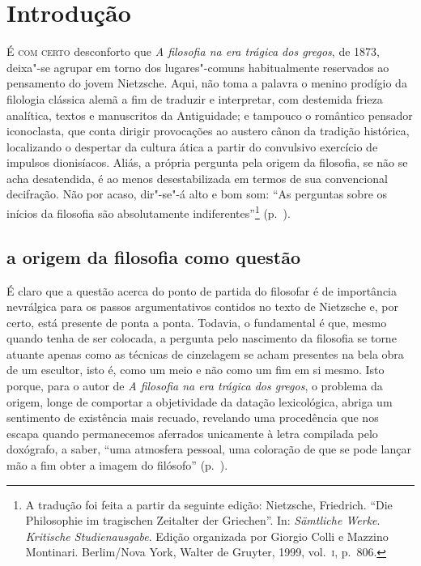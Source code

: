 
\chapter[Introdução, por Fernando R.~de Moraes Barros]{Introdução}

\textsc{É com certo} desconforto que \textit{A filosofia na era trágica dos
gregos}, de 1873, deixa"-se agrupar em torno dos lugares"-comuns
habitualmente reservados ao pensamento do jovem Nietzsche. Aqui, não
toma a palavra o menino prodígio da filologia clássica alemã a fim de
traduzir e interpretar, com destemida frieza analítica, textos e
manuscritos da Antiguidade; e tampouco o romântico pensador iconoclasta,
que conta dirigir provocações ao austero cânon da
tradição histórica, localizando o despertar da cultura ática a partir
do convulsivo exercício de impulsos dionisíacos. Aliás, a própria
pergunta pela origem da filosofia, se não se acha desatendida, é ao
menos desestabilizada em termos de sua convencional decifração. Não por
acaso, dir"-se"-á alto e bom som: ``As perguntas sobre os
inícios da filosofia são absolutamente
indiferentes''\footnote { A tradução foi feita a partir da seguinte edição: Nietzsche, Friedrich. ``Die
Philosophie im tragischen Zeitalter der Griechen''. In:
\textit{Sämtliche Werke}. \textit{Kritische Studienausgabe}. Edição
organizada por Giorgio Colli e Mazzino Montinari. Berlim/Nova York,
Walter de Gruyter, 1999, vol.~\textsc{i}, p.~806.} (p.~\pageref{perguntassobreosinicios}). 

\section{a origem da filosofia como questão}
É claro que a questão acerca do ponto de partida do filosofar é de
importância nevrálgica para os passos argumentativos contidos no texto
de Nietzsche e, por certo, está presente de ponta a ponta. Todavia, o
fundamental é que, mesmo quando tenha de ser colocada, a pergunta pelo
nascimento da filosofia se torne atuante apenas como as técnicas de
cinzelagem se acham presentes na bela obra de um escultor, isto é, como
um meio e não como um fim em si mesmo. Isto porque, para o autor de
\textit{A filosofia na era trágica dos gregos}, o problema da origem,
longe de comportar a objetividade da datação lexicológica, abriga um
sentimento de existência mais recuado, revelando uma procedência que
nos escapa quando permanecemos aferrados unicamente à letra compilada
pelo doxógrafo, a saber, ``uma atmosfera pessoal, uma
coloração de que se pode lançar mão a fim obter a imagem do
filósofo'' (p.~\pageref{atmosferapessoal}). 

